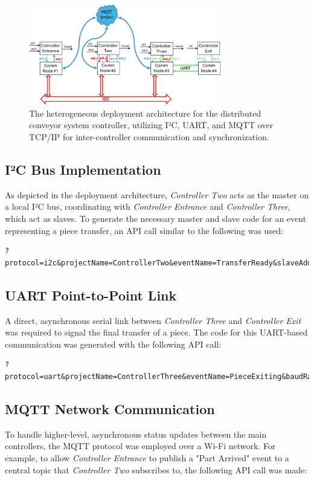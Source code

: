 \begin{figure}[htb]
    \centering
    \includegraphics[width=0.75\textwidth]{Chapters/Figures/prototypelayout.png}
    \caption{The heterogeneous deployment architecture for the distributed conveyor system controller, utilizing I²C, UART, and MQTT over TCP/IP for inter-controller communication and synchronization.}
    \label{fig:deployment_layout}
\end{figure}

\subsection{I²C Bus Implementation}
As depicted in the deployment architecture, \textit{Controller Two} acts as the master on a local I²C bus, coordinating with \textit{Controller Entrance} and \textit{Controller Three}, which act as slaves. To generate the necessary master and slave code for an event representing a piece transfer, an API call similar to the following was used:

\begin{verbatim}
?protocol=i2c&projectName=ControllerTwo&eventName=TransferReady&slaveAddress=8&slaveMessage=R
\end{verbatim}

\subsection{UART Point-to-Point Link}
A direct, asynchronous serial link between \textit{Controller Three} and \textit{Controller Exit} was required to signal the final transfer of a piece. The code for this UART-based communication was generated with the following API call:

\begin{verbatim}
?protocol=uart&projectName=ControllerThree&eventName=PieceExiting&baudRate=115200
\end{verbatim}

\subsection{MQTT Network Communication}
To handle higher-level, asynchronous status updates between the main controllers, the MQTT protocol was employed over a Wi-Fi network. For example, to allow \textit{Controller Entrance} to publish a "Part Arrived" event to a central topic that \textit{Controller Two} subscribes to, the following API call was made:

